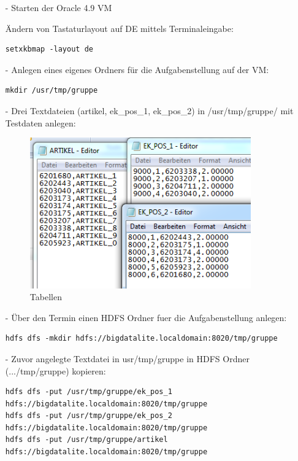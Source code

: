 \begin{itemize}
\item[-] Starten der Oracle 4.9 VM

Ändern von Tastaturlayout auf DE mittels Terminaleingabe:
\begin{lstlisting}
setxkbmap -layout de
\end{lstlisting}

\item[-] Anlegen eines eigenes Ordners für die Aufgabenstellung auf der VM:
\begin{lstlisting}
mkdir /usr/tmp/gruppe
\end{lstlisting}

\item[-] Drei Textdateien (artikel, ek\_pos\_1, ek\_pos\_2) in /usr/tmp/gruppe/ mit Testdaten anlegen:
\begin{figure}[!htb]
        \begin{minipage}{1\textwidth}
                \centering
                \includegraphics[width=0.90\textwidth]{pics/pig1.png}\par\vspace{0cm}
                \caption{Tabellen}
                \label{fig:pig1}
        \end{minipage}
\end{figure}

\item[-] Über den Termin einen HDFS Ordner fuer die Aufgabenstellung anlegen:
\begin{lstlisting}
hdfs dfs -mkdir hdfs://bigdatalite.localdomain:8020/tmp/gruppe
\end{lstlisting}

\item[-] Zuvor angelegte Textdatei in usr/tmp/gruppe in HDFS Ordner (.../tmp/gruppe) kopieren:
\begin{lstlisting}
hdfs dfs -put /usr/tmp/gruppe/ek_pos_1 hdfs://bigdatalite.localdomain:8020/tmp/gruppe
hdfs dfs -put /usr/tmp/gruppe/ek_pos_2 hdfs://bigdatalite.localdomain:8020/tmp/gruppe
hdfs dfs -put /usr/tmp/gruppe/artikel hdfs://bigdatalite.localdomain:8020/tmp/gruppe
\end{lstlisting}


\end{itemize}
